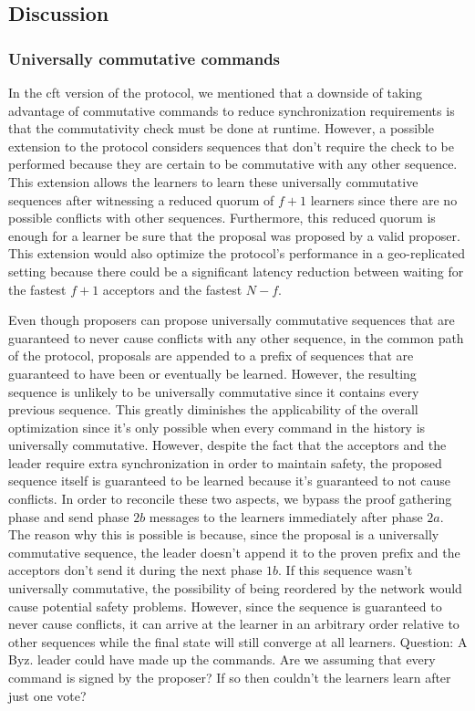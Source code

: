 \subsection{Discussion}
\subsubsection{Universally commutative commands}
In the \acrshort{cft} version of the protocol, we mentioned that a downside of taking advantage of commutative commands to reduce synchronization requirements is that the commutativity check must be done at runtime. However, a possible extension to the protocol considers sequences that don't require the check to be performed because they are certain to be commutative with any other sequence. This extension allows the learners to learn these universally commutative sequences after witnessing a reduced quorum of $f+1$ learners since there are no possible conflicts with other sequences. Furthermore, this reduced quorum is enough for a learner be sure that the proposal was proposed by a valid proposer. This extension would also optimize the protocol's performance in a geo-replicated setting because there could be a significant latency reduction between waiting for the fastest $f+1$ acceptors and the fastest $N-f$.\par
Even though proposers can propose universally commutative sequences that are guaranteed to never cause conflicts with any other sequence, in the common path of the protocol, proposals are appended to a prefix of sequences that are guaranteed to have been or eventually be learned. However, the resulting sequence is unlikely to be universally commutative since it contains every previous sequence. This greatly diminishes the applicability of the overall optimization since it's only possible when every command in the history is universally commutative. However, despite the fact that the acceptors and the leader require extra synchronization in order to maintain safety, the proposed sequence itself is guaranteed to be learned because it's guaranteed to not cause conflicts. In order to reconcile these two aspects, we bypass the proof gathering phase and send phase $2b$ messages to the learners immediately after phase $2a$. The reason why this is possible is because, since the proposal is a universally commutative sequence, the leader doesn't append it to the proven prefix and the acceptors don't send it during the next phase $1b$. If this sequence wasn't universally commutative, the possibility of being reordered by the network would cause potential safety problems. However, since the sequence is guaranteed to never cause conflicts, it can arrive at the learner in an arbitrary order relative to other sequences while the final state will still converge at all learners. {\color{red}Question: A Byz. leader could have made up the commands. Are we assuming that every command is signed by the proposer? If so then couldn't the learners learn after just one vote?}

